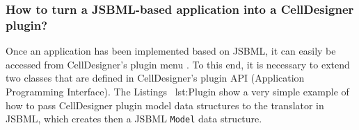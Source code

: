 \subsubsection{How to turn a JSBML-based application into a CellDesigner plugin?}

Once an application has been implemented based on JSBML, it can easily be
accessed from CellDesigner's plugin menu \citep{Funahashi2003}. To this end,
it is necessary to extend two classes that are defined in CellDesigner's plugin
API (Application Programming Interface). The Listings~
{lst:Plugin} show a very simple example of how to pass CellDesigner plugin
%
model data structures to the translator in JSBML,
which creates then a JSBML \texttt{Model} data structure.
%

% 
